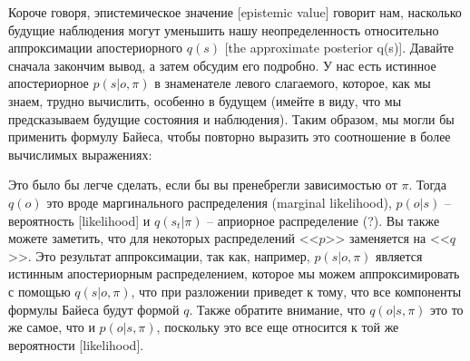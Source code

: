 \documentclass[twoside,leqno, 11pt]{article}
\begin{document}
	Короче говоря, эпистемическое значение [epistemic value] говорит нам, насколько будущие наблюдения могут уменьшить нашу неопределенность относительно аппроксимации апостериорного $q(s)$ [the approximate posterior q(s)]. Давайте сначала закончим вывод, а затем обсудим его подробно. У нас есть истинное апостериорное $p(s|o,\pi)$ в знаменателе левого слагаемого, которое, как мы знаем, трудно вычислить, особенно в будущем (имейте в виду, что мы предсказываем будущие состояния и наблюдения). Таким образом, мы могли бы применить формулу Байеса, чтобы повторно выразить это соотношение в более вычислимых выражениях:
	
	
	\begin{figure}[h]
	\end{figure}
	
	Это было бы легче сделать, если бы вы пренебрегли зависимостью от $\pi$. Тогда $q(o)$ это вроде маргинального распределения (marginal likelihood), $p(o|s)$ -- вероятность [likelihood] и $q(s_t|\pi)$ -- априорное распределение (?). Вы также можете заметить, что для некоторых распределений <<$p$>> заменяется на <<$q$>>. Это результат аппроксимации, так как, например, $p(s|o,\pi)$ является истинным апостериорным распределением, которое мы можем аппроксимировать с помощью $q(s|o,\pi)$, что при разложении приведет к тому, что все компоненты формулы Байеса будут формой $q$. Также обратите внимание, что $q(o|s,\pi)$ это то же самое, что и $p(o|s,\pi)$, поскольку это все еще относится к той же вероятности [likelihood].
	
\end{document}
